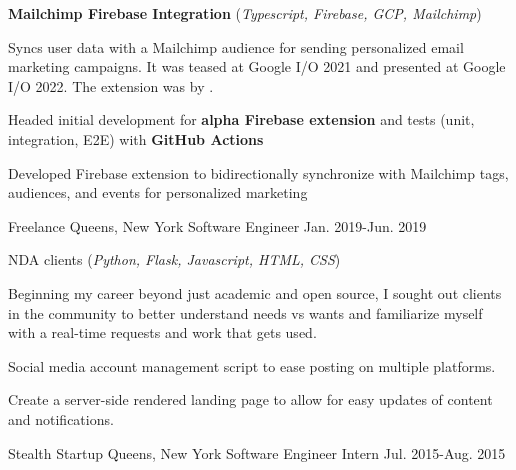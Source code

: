 \begin{cventries}
  \cvcustombodydescription
      {\textbf{Mailchimp Firebase Integration} (\emph{Typescript, Firebase, GCP, Mailchimp})}
      {
      \begin{cvtightprose} %
        {Syncs user data with a Mailchimp audience for sending personalized email marketing campaigns. It was teased at Google I/O 2021 and presented at Google I/O 2022. The extension was  by .}
      \end{cvtightprose}
      }
      {
      \begin{cvitems} %
        \item {Headed initial development for \textbf{alpha Firebase extension} and tests (unit, integration, E2E) with \textbf{GitHub Actions}}
        \item {Developed Firebase extension to bidirectionally synchronize with Mailchimp tags, audiences, and events for personalized marketing}
      \end{cvitems}
    }

  \nrolecventrynoitems
    {Freelance} %
    {Queens, New York} %
    {Software Engineer} %
    {Jan. 2019-Jun. 2019} %
    {} %
    {} %
    {} %
    {} %

  \cvcustombodydescription
    {NDA clients (\emph{Python, Flask, Javascript, HTML, CSS})}
    {
      \begin{cvtightprose} %
        {Beginning my career beyond just academic and open source, I sought out clients in the community to better understand needs vs wants and familiarize myself with a real-time requests and work that gets used.}
      \end{cvtightprose}
    }
    {
      \begin{cvitems} %
        \item {Social media account management script to ease posting on multiple platforms.}
        \item {Create a server-side rendered landing page to allow for easy updates of content and notifications.}
      \end{cvitems}
    }

  \nrolecventrynoitems
    {Stealth Startup} %
    {Queens, New York} %
    {Software Engineer Intern} %
    {Jul. 2015-Aug. 2015} %
    {} %
    {} %
    {} %
    {} %


\end{cventries}
